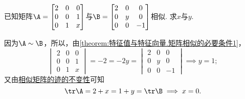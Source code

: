 \begin{example}
已知矩阵\(\A = \begin{bmatrix}
	2 & 0 & 0 \\
	0 & 0 & 1 \\
	0 & 1 & x
\end{bmatrix}\)与\(\B = \begin{bmatrix}
	2 & 0 & 0 \\
	0 & y & 0 \\
	0 & 0 & -1
\end{bmatrix}\)相似.
求\(x\)与\(y\).
\begin{solution}
因为\(\A\sim\B\)，所以，由\cref{theorem:特征值与特征向量.矩阵相似的必要条件1}，
\[
	\begin{vmatrix}
		2 & 0 & 0 \\
		0 & 0 & 1 \\
		0 & 1 & x
	\end{vmatrix}
	= -2 = -2y =
	\begin{vmatrix}
		2 & 0 & 0 \\
		0 & y & 0 \\
		0 & 0 & -1
	\end{vmatrix}
	\implies y = 1;
\]
又由\hyperref[theorem:特征值与特征向量.相似矩阵的迹的不变性]{相似矩阵的迹的不变性}可知\[
	\tr\A = 2+x
	= 1+y = \tr\B
	\implies
	x = 0.
\]
\end{solution}
\end{example}
